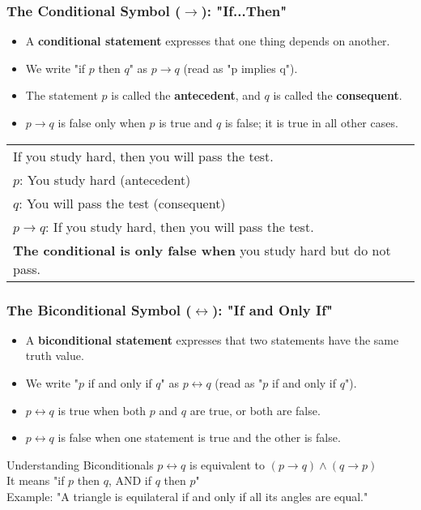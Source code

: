 \documentclass{beamer}
\begin{document}
    \begin{frame}
    \frametitle{The Conditional Symbol ($\rightarrow$): "If...Then"}
    \begin{itemize}
        \item A \textbf{conditional statement} expresses that one thing depends on another.
        \item We write "if $p$ then $q$" as $p \rightarrow q$ (read as "p implies q").
        \item The statement $p$ is called the \textbf{antecedent}, and $q$ is called the \textbf{consequent}.
        \item $p \rightarrow q$ is false only when $p$ is true and $q$ is false; it is true in all other cases.
    \end{itemize}
    
    \begin{tabular}{|p{}|}
    \hline
    If you study hard, then you will pass the test.\\[0.2cm]
    $p$: You study hard (antecedent)\\
    $q$: You will pass the test (consequent)\\
    $p \rightarrow q$: If you study hard, then you will pass the test.\\[0.2cm]
    \textbf{The conditional is only false when} you study hard but do not pass.\\
    \hline
    \end{tabular}
    \end{frame}

    \begin{frame}
        \frametitle{The Biconditional Symbol ($\leftrightarrow$): "If and Only If"}
        \begin{itemize}
            \item A \textbf{biconditional statement} expresses that two statements have the same truth value.
            \item We write "$p$ if and only if $q$" as $p \leftrightarrow q$ (read as "$p$ if and only if $q$").
            \item $p \leftrightarrow q$ is true when both $p$ and $q$ are true, or both are false.
            \item $p \leftrightarrow q$ is false when one statement is true and the other is false.
        \end{itemize}
        
        \begin{block}{Understanding Biconditionals}
        $p \leftrightarrow q$ is equivalent to $(p \rightarrow q) \wedge (q \rightarrow p)$\\
        It means "if $p$ then $q$, AND if $q$ then $p$"\\
        Example: "A triangle is equilateral if and only if all its angles are equal."
        \end{block}
        \end{frame}
        
\end{document}
